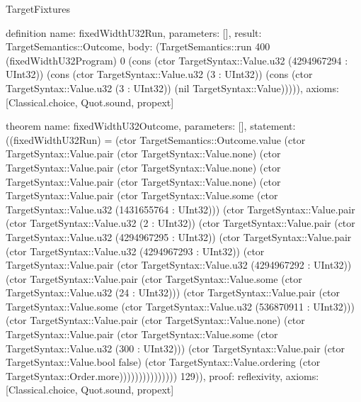 \begin{lexlean}{TargetFixtures}
\begin{semanticmodule}
definition{
  name: fixedWidthU32Run,
  parameters: [],
  result: TargetSemantics::Outcome,
  body: (TargetSemantics::run 400 (fixedWidthU32Program) 0 (cons (ctor TargetSyntax::Value.u32 (4294967294 : UInt32)) (cons (ctor TargetSyntax::Value.u32 (3 : UInt32)) (cons (ctor TargetSyntax::Value.u32 (3 : UInt32)) (nil TargetSyntax::Value))))),
  axioms: [Classical.choice, Quot.sound, propext]
}

theorem{
  name: fixedWidthU32Outcome,
  parameters: [],
  statement: ((fixedWidthU32Run) = (ctor TargetSemantics::Outcome.value (ctor TargetSyntax::Value.pair (ctor TargetSyntax::Value.none) (ctor TargetSyntax::Value.pair (ctor TargetSyntax::Value.none) (ctor TargetSyntax::Value.pair (ctor TargetSyntax::Value.none) (ctor TargetSyntax::Value.pair (ctor TargetSyntax::Value.some (ctor TargetSyntax::Value.u32 (1431655764 : UInt32))) (ctor TargetSyntax::Value.pair (ctor TargetSyntax::Value.u32 (2 : UInt32)) (ctor TargetSyntax::Value.pair (ctor TargetSyntax::Value.u32 (4294967295 : UInt32)) (ctor TargetSyntax::Value.pair (ctor TargetSyntax::Value.u32 (4294967293 : UInt32)) (ctor TargetSyntax::Value.pair (ctor TargetSyntax::Value.u32 (4294967292 : UInt32)) (ctor TargetSyntax::Value.pair (ctor TargetSyntax::Value.some (ctor TargetSyntax::Value.u32 (24 : UInt32))) (ctor TargetSyntax::Value.pair (ctor TargetSyntax::Value.some (ctor TargetSyntax::Value.u32 (536870911 : UInt32))) (ctor TargetSyntax::Value.pair (ctor TargetSyntax::Value.none) (ctor TargetSyntax::Value.pair (ctor TargetSyntax::Value.some (ctor TargetSyntax::Value.u32 (300 : UInt32))) (ctor TargetSyntax::Value.pair (ctor TargetSyntax::Value.bool false) (ctor TargetSyntax::Value.ordering (ctor TargetSyntax::Order.more))))))))))))))) 129)),
  proof: reflexivity{},
  axioms: [Classical.choice, Quot.sound, propext]
}


\end{semanticmodule}
\end{lexlean}
